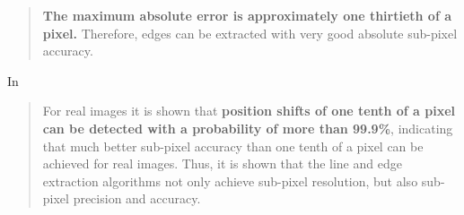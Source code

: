 \documentclass[a4paper,12pt]{article}
\begin{document}
\begin{quotation}
\textbf{The maximum absolute error is approximately one thirtieth of a pixel.} Therefore, edges can be
extracted with very good absolute sub-pixel accuracy.
\end{quotation}

In \cite[Chapter 6 Conclusions, p.168]{Steger}
\begin{quotation}
For real images it is shown that \textbf{position shifts of one tenth of a pixel can be
detected with a probability of more than 99.9\%}, indicating that much better sub-pixel accuracy
than one tenth of a pixel can be achieved for real images. Thus, it is shown that the line and
edge extraction algorithms not only achieve sub-pixel resolution, but also sub-pixel precision
and accuracy.
\end{quotation}








\printbibliography
\end{document}
